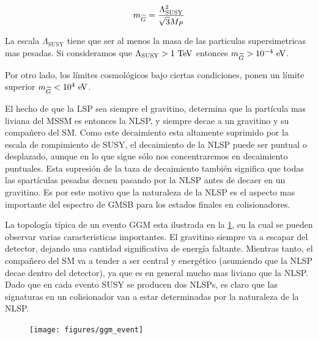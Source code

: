 \begin{equation}
  m_{\widetilde{G}} = \frac{\Lambda^2_{\text{SUSY}}}{\sqrt{3}M_P}
\end{equation}

La escala $\Lambda_{\text{SUSY}}$ tiene que ser al menos la masa de las
particulas supersimetricas mas pesadas. Si consideramos que
$\Lambda_{\text{SUSY}} > 1 \tev$ entonces $m_{\gravino} > 10^{-4} \eV$.

Por otro lado, los límites cosmológicos \cite{PhysRevLett.48.223,Moroi:1993mb}
bajo ciertas condiciones, ponen un límite superior $m_{\gravino} < 10^4 \eV$.%

El hecho de que la LSP sea siempre el gravitino, determina que la partícula mas
liviana del MSSM es entonces la NLSP, y siempre decae a un gravitino y su
compañero del SM. Como este decaimiento esta altamente suprimido por la escala
de rompimiento de SUSY, el decaimiento de la NLSP puede ser puntual o
desplazado, aunque en lo que sigue sólo nos concentraremos en decaimiento
puntuales. Esta supresión de la taza de decaimiento también significa que todas las
spartículas pesadas decaen pasando por la NLSP antes de decaer en un gravitino.
Es por este motivo que la naturaleza de la NLSP es el aspecto mas importante del
espectro de GMSB para los estados finales en colisionadores.


La topología típica de un evento GGM esta ilustrada en la
\cref{fig:ggm_event}, en la cual se pueden observar varias caracteristicas
importantes. El gravitino siempre va a escapar del detector, dejando una
cantidad significativa de energía faltante. Mientras tanto, el compañero del SM
va a tender a ser central y energético (asumiendo que la NLSP decae dentro del
detector), ya que es en general mucho mas liviano que la NLSP. Dado que en cada
evento SUSY se producen dos NLSPs, es claro que las signaturas en un
colisionador van a estar determinadas por la naturaleza de la NLSP.

\begin{figure}[!htbp]
  \centering
  \texttt{[image: figures/ggm\_event]}
  \caption{}
  \label{fig:ggm_event}
\end{figure}




